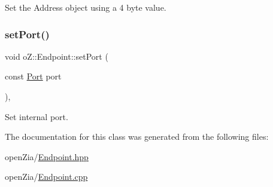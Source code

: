 Set the Address object using a 4 byte value. 

\mbox{\label{classo_z_1_1_endpoint_ab2e2765d1e7d6e40128772ac045872a0}} 
\subsubsection{\texorpdfstring{setPort()}{setPort()}}
{\footnotesize\ttfamily void o\+Z\+::\+Endpoint\+::set\+Port (\begin{DoxyParamCaption}\item[{const \mbox{\hyperlink{namespaceo_z_afeccb82d451972ba3b7d2a32b066b30b}{Port}}}]{port }\end{DoxyParamCaption})\hspace{0.3cm}{\ttfamily [inline]}, {\ttfamily [noexcept]}}



Set internal port. 



The documentation for this class was generated from the following files\+:\begin{DoxyCompactItemize}
\item 
open\+Zia/\mbox{\hyperlink{_endpoint_8hpp}{Endpoint.\+hpp}}\item 
open\+Zia/\mbox{\hyperlink{_endpoint_8cpp}{Endpoint.\+cpp}}\end{DoxyCompactItemize}
